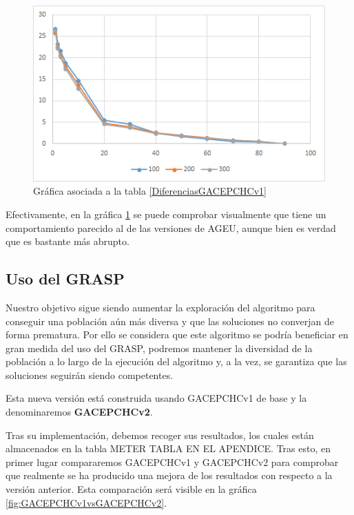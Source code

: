 \begin{figure}[h]
		\centering
		\includegraphics[scale=1]{imagenes/Experimental/DiferenciasGACEPCHCv1.png}
        \caption{Gráfica asociada a la tabla \ref{DiferenciasGACEPCHCv1}}
        \label{fig:DiferenciasGACEPCHCv1}
\end{figure}

Efectivamente, en la gráfica \ref{fig:DiferenciasGACEPCHCv1} se puede comprobar visualmente que tiene un comportamiento parecido al de las versiones de AGEU, aunque bien es verdad que es bastante más abrupto.

\subsection{Uso del GRASP}

Nuestro objetivo sigue siendo aumentar la exploración del algoritmo para conseguir una población aún más diversa y que las soluciones no converjan de forma prematura. 
Por ello se considera que este algoritmo se podría beneficiar en gran medida del uso del GRASP, podremos mantener la diversidad de la población a lo largo de la ejecución del algoritmo y, a la vez, se garantiza que las soluciones seguirán siendo competentes. 

Esta nueva versión está construida usando GACEPCHCv1 de base y la denominaremos \textbf{GACEPCHCv2}.

Tras su implementación, debemos recoger sus resultados, los cuales están almacenados en la tabla \color{red}METER TABLA EN EL APENDICE\color{black}. 
Tras esto, en primer lugar compararemos GACEPCHCv1 y GACEPCHCv2 para comprobar que realmente se ha producido una mejora de los resultados con respecto a la versión anterior. 
Esta comparación será visible en la gráfica \ref{fig:GACEPCHCv1vsGACEPCHCv2}.

